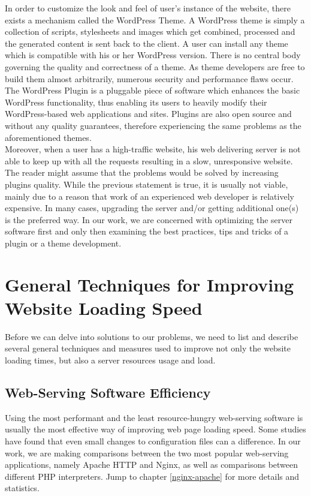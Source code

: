 In order to customize the look and feel of user’s instance of the website, there exists a mechanism called the WordPress Theme. A WordPress theme is simply a collection of scripts, stylesheets and images which get combined, processed and the generated content is sent back to the client. A user can install any theme which is compatible with his or her WordPress version. There is no central body governing the quality and correctness of a theme. As theme developers are free to build them almost arbitrarily, numerous security and performance flaws occur. The WordPress Plugin is a pluggable piece of software which enhances the basic WordPress functionality, thus enabling its users to heavily modify their WordPress-based web applications and sites. Plugins are also open source and without any quality guarantees, therefore experiencing the same problems as the aforementioned themes. \\

Moreover, when a user has a high-traffic website, his web delivering server is not able to keep up with all the requests resulting in a slow, unresponsive website. The reader might assume that the problems would be solved by increasing plugins quality. While the previous statement is true, it is usually not viable, mainly due to a reason that work of an experienced web developer is relatively expensive. In many cases, upgrading the server and/or getting additional one(s) is the preferred way. In our work, we are concerned with optimizing the server software first and only then examining the best practices, tips and tricks of a plugin or a theme development.

\section{General Techniques for Improving Website Loading Speed}

Before we can delve into solutions to our problems, we need to list and describe several general techniques and measures used to improve not only the website loading times, but also a server resources usage and load.

\subsection{Web-Serving Software Efficiency}

Using the most performant and the least resource-hungry web-serving software is usually the most effective way of improving web page loading speed. Some studies have found that even small changes to configuration files can a difference. In our work, we are making comparisons between the two most popular web-serving applications, namely Apache HTTP and Nginx, as well as comparisons between different PHP interpreters. Jump to chapter \ref{nginx-apache} for more details and statistics. 

